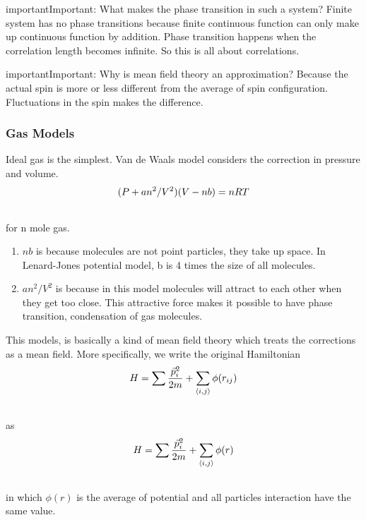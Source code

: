 \documentclass[letterpaper,10pt,english]{sphinxmanual}
\begin{document}
\begin{notice}{important}{Important:}
What makes the phase transition in such a system? Finite system has no phase transitions because finite continuous function can only make up continuous function by addition. Phase transition happens when the correlation length becomes infinite. So this is all about correlations.
\end{notice}

\begin{notice}{important}{Important:}
Why is mean field theory an approximation? Because the actual spin is more or less different from the average of spin configuration. Fluctuations in the spin makes the difference.
\end{notice}


\subsubsection{Gas Models}
\label{equilibrium/week4:gas-models}
Ideal gas is the simplest. Van de Waals model considers the correction in pressure and volume.
\begin{gather}
\begin{split}(P + a n^2/V^2)(V- n b) = n R T\end{split}\notag\\\begin{split}\end{split}\notag
\end{gather}
for n mole gas.
\begin{enumerate}
\item {} 
$nb$ is because molecules are not point particles, they take up space. In Lenard-Jones potential model, b is 4 times the size of all molecules.

\item {} 
$a n^2/V^2$ is because in this model molecules will attract to each other when they get too close. This attractive force makes it possible to have phase transition, condensation of gas molecules.

\end{enumerate}

This models, is basically a kind of mean field theory which treats the corrections as a mean field. More specifically, we write the original Hamiltonian
\begin{gather}
\begin{split}H = \sum \frac{\vec p_i^2}{2m} + \sum _ {\langle i,j \rangle} \phi(r_{ij})\end{split}\notag\\\begin{split}\end{split}\notag
\end{gather}
as
\begin{gather}
\begin{split}H = \sum \frac{\vec p_i^2}{2m} +  \sum _ {\langle i,j \rangle} \phi(r)\end{split}\notag\\\begin{split}\end{split}\notag
\end{gather}
in which $\phi(r)$ is the average of potential and all particles interaction have the same value.
\end{document}
